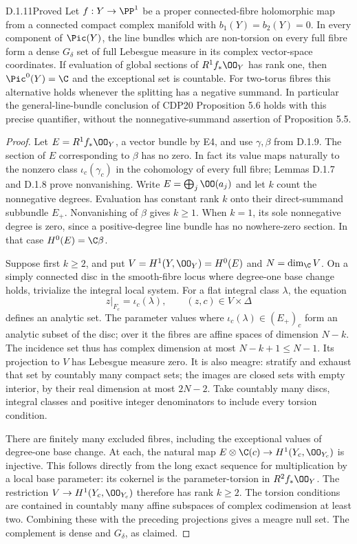 \begin{idstatement}{D.1.11}{Proved}\label{st:D.1.11}
Let $f:Y\to\PP^1$ be a proper connected-fibre holomorphic map from
a connected compact complex manifold with $b_1(Y)=b_2(Y)=0$.
In every component of $\Pic(Y)$, the line
bundles which are non-torsion on every full fibre form a dense
$G_\delta$ set of full Lebesgue measure in its complex vector-space
coordinates. If evaluation of global sections of $R^1f_*\OO_Y$
has rank one, then $\Pic^0(Y)=\C$ and the exceptional set is
countable. For two-torus fibres this alternative holds whenever
the splitting has a negative summand.
In particular the general-line-bundle conclusion of CDP20
Proposition 5.6 holds with this precise quantifier, without the
nonnegative-summand assertion of Proposition 5.5.
\end{idstatement}
\begin{proof}
Let $E=R^1f_*\OO_Y$, a vector bundle by E4, and use
$\gamma,\beta$ from D.1.9. The section of $E$ corresponding to
$\beta$ has no zero. In fact its value maps naturally to the
nonzero class $\iota_c(\gamma_c)$ in the cohomology of every full
fibre; Lemmas D.1.7 and D.1.8 prove nonvanishing. Write
$E=\bigoplus_j\OO(a_j)$ and let $k$ count the nonnegative degrees.
Evaluation has constant rank $k$ onto their direct-summand subbundle
$E_+$. Nonvanishing of $\beta$ gives $k\geq1$. When $k=1$, its
sole nonnegative degree is zero, since a positive-degree line bundle
has no nowhere-zero section. In that case $H^0(E)=\C\beta$.

Suppose first $k\geq2$, and put $V=H^1(Y,\OO_Y)=H^0(E)$ and
$N=\dim_{\C}V$. On a simply connected disc in the smooth-fibre
locus where degree-one base change holds, trivialize the integral
local system. For a flat integral
class $\lambda$, the equation
\[
z|_{F_c}=\iota_c(\lambda),\qquad (z,c)\in V\times\Delta
\]
defines an analytic set. The parameter values where
$\iota_c(\lambda)\in(E_+)_c$ form an analytic subset of the disc;
over it the fibres are affine spaces of dimension $N-k$.
The incidence set thus has complex dimension at most
$N-k+1\leq N-1$. Its projection to $V$ has Lebesgue
measure zero. It is also meagre: stratify and exhaust that set
by countably many compact sets; the images are closed sets with
empty interior, by their real dimension at most $2N-2$.
Take countably many discs, integral classes and positive integer
denominators to include every torsion condition.

There are finitely many excluded fibres, including the exceptional
values of degree-one base change. At each, the natural map
$E\otimes\C(c)\to H^1(Y_c,\OO_{Y_c})$ is injective. This follows
directly from the long exact sequence for multiplication by a local
base parameter: its cokernel is the parameter-torsion in
$R^2f_*\OO_Y$. The restriction $V\to H^1(Y_c,\OO_{Y_c})$
therefore has rank $k\geq2$. The torsion conditions are contained in
countably many affine subspaces of complex codimension at least
two. Combining these with the preceding projections gives a
meagre null set. The complement is dense and $G_\delta$, as claimed.


\end{proof}
